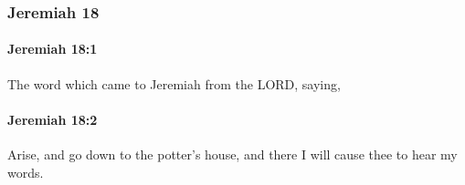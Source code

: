 	\subsubsection{Jeremiah 18} %
		\label{JEREMIAH-18}

		\paragraph{Jeremiah 18:1} %
			\label{JEREMIAH-18-1}

			The word which came to Jeremiah from the LORD, saying,


		\paragraph{Jeremiah 18:2} %
			\label{JEREMIAH-18-2}

			Arise, and go down to the potter’s house, and there I will cause thee to hear my words.

